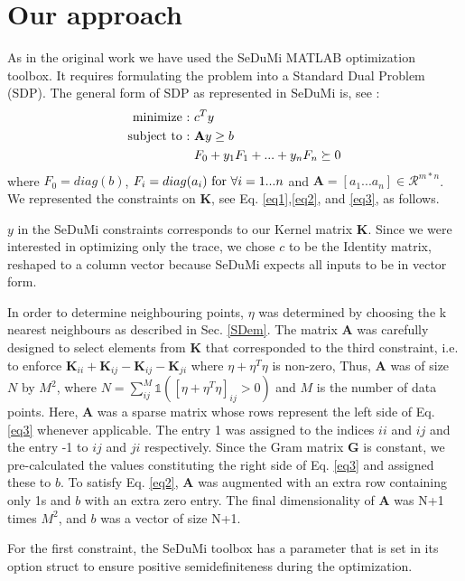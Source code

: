 \documentclass[a4paper,12pt]{article}
\newcommand{\mG}{\mathbf{G}}
\newcommand{\mK}{\mathbf{K}}
\newcommand{\K}{\textbf{K}}
\begin{document}
\section{Our approach}
\label{sec:method}
As in the original work we have used the SeDuMi MATLAB optimization toolbox. It requires formulating the problem into a Standard Dual Problem (SDP). The general form of SDP as represented in SeDuMi is, see \cite{SeDuMi}:
\begin{align}
\textnormal{minimize :}~& c^T y \\
\textnormal{subject to :}~& \mathbf{A}y \ge b \\
~& F_0 + y_1 F_1 + ... + y_n F_n\succeq 0
\end{align}
where $F_0 = diag(b)$, $F_i = diag(a_i) \textnormal{ for } \forall i = 1...n$ and $\mathbf{A} = [a_1 . . . a_n] \in \mathcal{R}^{m * n}$. 
We represented the constraints on \K, see Eq. \ref{eq1},\ref{eq2}, and \ref{eq3}, as follows.

$y$ in the SeDuMi constraints corresponds to our Kernel matrix $\mK$. Since we were interested in optimizing only the trace, we chose $c$ to be the Identity matrix, reshaped to a column vector because SeDuMi expects all inputs to be in vector form.

In order to determine neighbouring points, $\eta$ was determined by choosing the k nearest neighbours as described in Sec. \ref{SDem}. The matrix $\mathbf{A}$ was carefully designed to select elements from $\mK$ that corresponded to the third constraint, i.e. to enforce $\mK_{ii} + \mK_{ij} - \mK_{ij} - \mK_{ji}$ where $\eta+\eta^T\eta$ is non-zero, Thus, $\mathbf{A}$ was of size $N$ by $M^2$, where $N = \sum_{ij}^M{\mathbb{1}([\eta+\eta^T\eta]_{ij} > 0)}$ and $M$ is the number of data points. Here, $\mathbf{A}$ was a sparse matrix whose rows represent the left side of Eq. \ref{eq3} whenever applicable. The entry 1 was assigned to the indices $ii$ and $ij$ and the entry -1 to $ij$ and $ji$ respectively. Since the Gram matrix $\mG$ is constant, we pre-calculated the values constituting the right side of Eq. \ref{eq3} and assigned these to $b$. To satisfy Eq. \ref{eq2}, $\mathbf{A}$ was augmented with an extra row containing only 1s and $b$ with an extra zero entry. The final dimensionality of $\mathbf{A}$ was N+1 times $M^2$, and $b$ was a vector of size N+1.

For the first constraint, the SeDuMi toolbox has a parameter that is set in its option struct to ensure positive semidefiniteness during the optimization.
\end{document}
